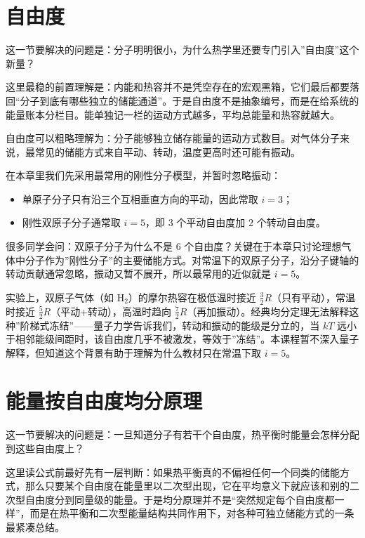 \documentclass[lang=cn,11pt]{elegantbook}
\newcommand{\bridge}[1]{\begin{note}#1\end{note}}
\begin{document}
\section{自由度}

这一节要解决的问题是：分子明明很小，为什么热学里还要专门引入”自由度”这个新量？

这里最稳的前置理解是：内能和热容并不是凭空存在的宏观黑箱，它们最后都要落回“分子到底有哪些独立的储能通道”。于是自由度不是抽象编号，而是在给系统的能量账本分栏目。能单独记一栏的运动方式越多，平均总能量和热容就越大。

自由度可以粗略理解为：分子能够独立储存能量的运动方式数目。对气体分子来说，最常见的储能方式来自平动、转动，温度更高时还可能有振动。

在本章里我们先采用最常用的刚性分子模型，并暂时忽略振动：
\begin{itemize}
 \item 单原子分子只有沿三个互相垂直方向的平动，因此常取 \(i=3\)；
 \item 刚性双原子分子通常取 \(i=5\)，即 \(3\) 个平动自由度加 \(2\) 个转动自由度。
\end{itemize}

\begin{note}
很多同学会问：双原子分子为什么不是 \(6\) 个自由度？关键在于本章只讨论理想气体中分子作为”刚性分子”的主要储能方式。对常温下的双原子分子，沿分子键轴的转动贡献通常忽略，振动又暂不展开，所以最常用的近似就是 \(i=5\)。
\end{note}

\bridge{实验上，双原子气体（如 \(\mathrm{H_2}\)）的摩尔热容在极低温时接近 \(\frac32 R\)（只有平动），常温时接近 \(\frac52 R\)（平动+转动），高温时趋向 \(\frac72 R\)（再加振动）。经典均分定理无法解释这种”阶梯式冻结”——量子力学告诉我们，转动和振动的能级是分立的，当 \(kT\) 远小于相邻能级间距时，该自由度几乎不被激发，等效于”冻结”。本课程暂不深入量子解释，但知道这个背景有助于理解为什么教材只在常温下取 \(i=5\)。}

\section{能量按自由度均分原理}

这一节要解决的问题是：一旦知道分子有若干个自由度，热平衡时能量会怎样分配到这些自由度上？

这里读公式前最好先有一层判断：如果热平衡真的不偏袒任何一个同类的储能方式，那么只要某个自由度在能量里以二次型出现，它在平均意义下就应该和别的二次型自由度分到同量级的能量。于是均分原理并不是“突然规定每个自由度都一样”，而是在热平衡和二次型能量结构共同作用下，对各种可独立储能方式的一条最紧凑总结。
\end{document}
